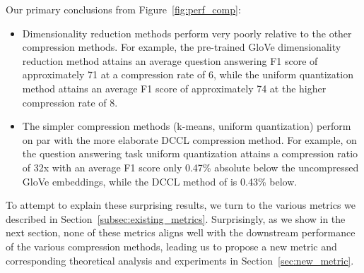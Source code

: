 Our primary conclusions from Figure~\ref{fig:perf_comp}:
\begin{itemize}
\item Dimensionality reduction methods perform very poorly relative to the other compression methods.
For example, the pre-trained GloVe dimensionality reduction method attains an average question answering F1 score of approximately 71 at a compression rate of 6, while the uniform quantization method attains an average F1 score of approximately 74 at the higher compression rate of 8.
\item The simpler compression methods (k-means, uniform quantization) perform on par with the more elaborate DCCL compression method.
For example, on the question answering task uniform quantization attains a compression ratio of 32x with an average F1 score only 0.47\% absolute below the uncompressed GloVe embeddings, while the DCCL method of \citet{dccl17} is 0.43\% below.
\end{itemize}
To attempt to explain these surprising results, we turn to the various metrics we described in Section~\ref{subsec:existing_metrics}.
Surprisingly, as we show in the next section, none of these metrics aligns well with the downstream performance of the various compression methods, leading us to propose a new metric and corresponding theoretical analysis and experiments in Section~\ref{sec:new_metric}.


